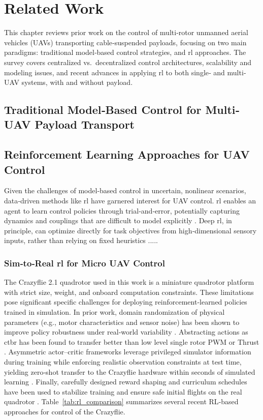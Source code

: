 
\chapter{Related Work}
This chapter reviews prior work on the control of multi‐rotor unmanned aerial vehicles (UAVs) transporting cable‐suspended payloads, focusing on two main paradigms: traditional model‐based control strategies, and \gls{rl} approaches. The survey covers centralized vs.\ decentralized control architectures, scalability and modeling issues, and recent advances in applying \gls{rl} to both single‐ and multi‐UAV systems, with and without payload. 

\section{Traditional Model‐Based Control for Multi‐UAV Payload Transport}
\autocite{Wahba2024}


\section{Reinforcement Learning Approaches for UAV Control}
Given the challenges of model‐based control in uncertain, nonlinear scenarios, data‐driven methods like \gls{rl} have garnered interest for UAV control. \gls{rl} enables an agent to learn control policies through trial‐and‐error, potentially capturing dynamics and couplings that are difficult to model explicitly \cite{sutton_reinforcement_nodate}. Deep \gls{rl}, in principle, can optimize directly for task objectives from high‐dimensional sensory inputs, rather than relying on fixed heuristics \cite{song_reaching_2023}.....

\subsection{Sim‐to‐Real \gls{rl} for Micro UAV Control}
The Crazyflie 2.1 quadrotor used in this work is a miniature quadrotor platform with strict size, weight, and onboard computation constraints. These limitations pose significant specific challenges for deploying reinforcement‐learned policies trained in simulation. In prior work, domain randomization of physical parameters (e.g., motor characteristics and sensor noise) has been shown to improve policy robustness under real‐world variability \autocite{molchanov_sim--multi-real_2019}. Abstracting actions as \gls{ctbr} has been found to transfer better than low level single rotor PWM or Thrust  \autocite{kaufmann_benchmark_2022}. Asymmetric actor–critic frameworks leverage privileged simulator information during training while enforcing realistic observation constraints at test time, yielding zero‐shot transfer to the Crazyflie hardware within seconds of simulated learning \autocite{eschmann_learning_2024}. Finally, carefully designed reward shaping and curriculum schedules have been used to stabilize training and ensure safe initial flights on the real quadrotor \autocite{chen_what_2024}. Table~\ref{tab:rl_comparison} summarizes several recent RL‐based approaches for control of the Crazyflie.



